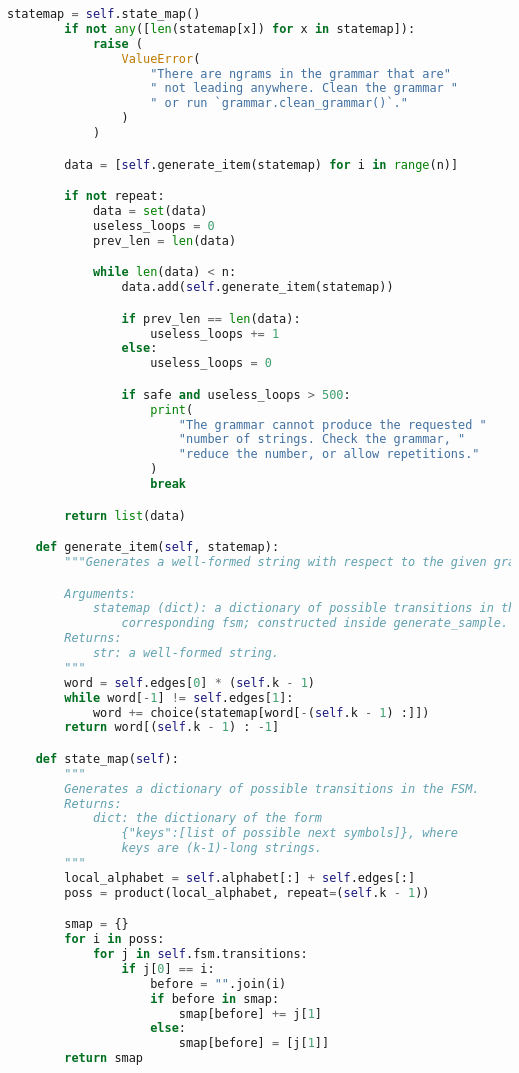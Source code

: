 \begin{lstlisting}[language=Python]
        statemap = self.state_map()
        if not any([len(statemap[x]) for x in statemap]):
            raise (
                ValueError(
                    "There are ngrams in the grammar that are"
                    " not leading anywhere. Clean the grammar "
                    " or run `grammar.clean_grammar()`."
                )
            )

        data = [self.generate_item(statemap) for i in range(n)]

        if not repeat:
            data = set(data)
            useless_loops = 0
            prev_len = len(data)

            while len(data) < n:
                data.add(self.generate_item(statemap))

                if prev_len == len(data):
                    useless_loops += 1
                else:
                    useless_loops = 0

                if safe and useless_loops > 500:
                    print(
                        "The grammar cannot produce the requested "
                        "number of strings. Check the grammar, "
                        "reduce the number, or allow repetitions."
                    )
                    break

        return list(data)

    def generate_item(self, statemap):
        """Generates a well-formed string with respect to the given grammar.

        Arguments:
            statemap (dict): a dictionary of possible transitions in the
                corresponding fsm; constructed inside generate_sample.
        Returns:
            str: a well-formed string.
        """
        word = self.edges[0] * (self.k - 1)
        while word[-1] != self.edges[1]:
            word += choice(statemap[word[-(self.k - 1) :]])
        return word[(self.k - 1) : -1]

    def state_map(self):
        """
        Generates a dictionary of possible transitions in the FSM.
        Returns:
            dict: the dictionary of the form
                {"keys":[list of possible next symbols]}, where 
                keys are (k-1)-long strings.
        """
        local_alphabet = self.alphabet[:] + self.edges[:]
        poss = product(local_alphabet, repeat=(self.k - 1))

        smap = {}
        for i in poss:
            for j in self.fsm.transitions:
                if j[0] == i:
                    before = "".join(i)
                    if before in smap:
                        smap[before] += j[1]
                    else:
                        smap[before] = [j[1]]
        return smap


\end{lstlisting}
